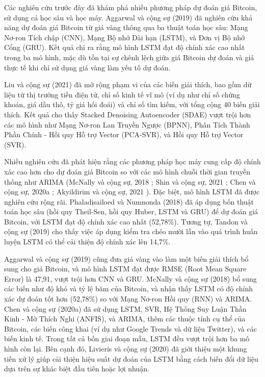 Các nghiên cứu trước đây đã khám phá nhiều phương pháp dự đoán giá Bitcoin, sử dụng cả học sâu và học máy. Aggarwal và cộng sự (2019) đã nghiên cứu khả năng dự đoán giá Bitcoin từ giá vàng thông qua ba thuật toán học sâu: Mạng Nơ-ron Tích chập (CNN), Mạng Bộ nhớ Dài hạn (LSTM), và Đơn vị Bộ nhớ Cổng (GRU). Kết quả chỉ ra rằng mô hình LSTM đạt độ chính xác cao nhất trong ba mô hình, mặc dù tồn tại sự chênh lệch giữa giá Bitcoin dự đoán và giá thực tế khi chỉ sử dụng giá vàng làm yếu tố dự đoán.

Liu và cộng sự (2021) \cite{6} đã mở rộng phạm vi của các biến giải thích, bao gồm dữ liệu từ thị trường tiền điện tử, chỉ số kinh tế vĩ mô (ví dụ như chỉ số chứng khoán, giá dầu thô, tỷ giá hối đoái) và chỉ số tìm kiếm, với tổng cộng 40 biến giải thích. Kết quả cho thấy Stacked Denoising Autoencoder (SDAE) vượt trội hơn các mô hình như Mạng Nơ-ron Lan Truyền Ngược (BPNN), Phân Tích Thành Phần Chính - Hồi quy Hỗ trợ Vector (PCA-SVR), và Hồi quy Hỗ trợ Vector (SVR).

Nhiều nghiên cứu đã phát hiện rằng các phương pháp học máy cung cấp độ chính xác cao hơn cho dự đoán giá Bitcoin so với các mô hình chuỗi thời gian truyền thống như ARIMA (McNally và cộng sự, 2018 \cite{8}; Shin và cộng sự, 2021 \cite{9}; Chen và cộng sự, 2020a \cite{10}; Akyildirim và cộng sự, 2021 \cite{11}). Đặc biệt, mô hình LSTM đã được nghiên cứu rộng rãi. Phaladisailoed và Numnonda (2018) \cite{12} đã áp dụng bốn thuật toán học sâu (hồi quy Theil-Sen, hồi quy Huber, LSTM và GRU) để dự đoán giá Bitcoin, với LSTM đạt độ chính xác cao nhất (52,78\%). Tương tự, Tandon và cộng sự (2019) cho thấy việc áp dụng kiểm tra chéo mười lần vào quá trình huấn luyện LSTM có thể cải thiện độ chính xác lên 14,7\%.

Aggarwal và cộng sự (2019) cũng đưa giá vàng vào làm một biến giải thích bổ sung cho giá Bitcoin, và mô hình LSTM đạt được RMSE (Root Mean Square Error) là 47,91, vượt trội hơn CNN và GRU. McNally và cộng sự (2018) \cite{8} bổ sung các biến như độ khó và tỷ lệ băm của Bitcoin, và nhận thấy LSTM có độ chính xác dự đoán tốt hơn (52,78\%) so với Mạng Nơ-ron Hồi quy (RNN) và ARIMA. Chen và cộng sự (2020a) \cite{10} đã sử dụng LSTM, SVR, Hệ Thống Suy Luận Thần Kinh - Mờ Thích Nghi (ANFIS), và ARIMA, thêm các thuộc tính cụ thể của Bitcoin, các biến công khai (ví dụ như Google Trends và dữ liệu Twitter), và các biến kinh tế. Trong tất cả bốn giai đoạn mẫu, LSTM đều vượt trội hơn ba mô hình còn lại. Bên cạnh đó, Livieris và cộng sự (2020) đã giới thiệu một khung tiền xử lý giúp cải thiện hiệu suất dự đoán của LSTM bằng cách biến đổi dữ liệu dựa trên sự khác biệt đầu tiên hoặc lợi nhuận.

